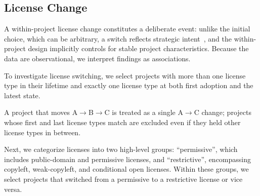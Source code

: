 \subsection{License Change}

A within-project license change constitutes a deliberate event:
unlike the initial choice, which can be arbitrary, a switch reflects
strategic intent~\cite{kechagia2010open}, and the within-project
design implicitly controls for stable project characteristics. Because
the data are observational, we interpret findings as associations.

To investigate license switching, we select projects with more than
one license type in their lifetime and exactly one license type at
both first adoption and the latest state.

A project that moves A$\rightarrow$B$\rightarrow$C is treated as a single
A$\rightarrow$C change; projects whose first and last license types match
are excluded even if they held other license types in between.

Next, we categorize licenses into two high-level groups: ``permissive'', which 
includes public-domain and permissive licenses, and ``restrictive'', encompassing 
copyleft, weak-copyleft, and conditional open licenses.
Within these groups, we select projects that switched from a permissive to a 
restrictive license or vice versa.

